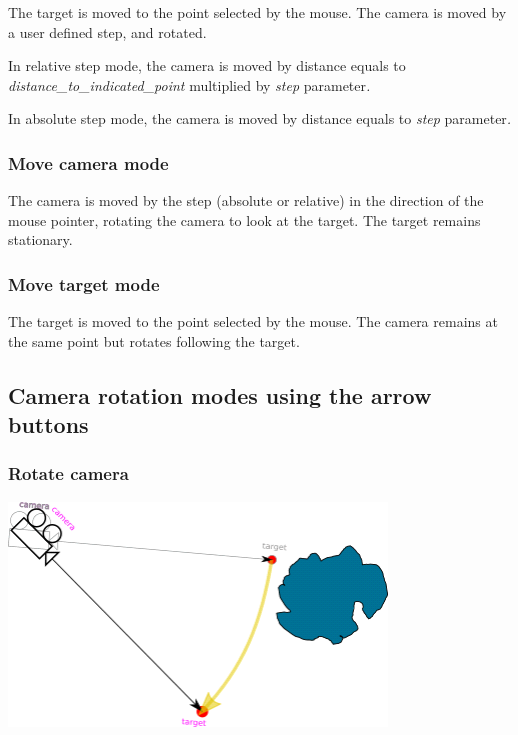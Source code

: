 The target is moved to the point selected by the mouse. The camera is moved by a
user defined step, and rotated.

In relative step mode, the camera is moved by distance equals to
\emph{distance\_to\_indicated\_point} multiplied by \emph{step}
parameter\emph{.}

In absolute step mode, the camera is moved by distance equals to \emph{step}
parameter\emph{.}

\subsubsection{Move camera mode}\label{move-camera-mode-1}

The camera is moved by the step (absolute or relative) in the direction of the
mouse pointer, rotating the camera to look at the target. The target remains
stationary.

\subsubsection{Move target mode}\label{move-target-mode-1}

The target is moved to the point selected by the mouse. The camera remains at
the same point but rotates following the target.

\subsection{Camera rotation modes using the arrow
	buttons}\label{camera-rotation-modes-using-the-arrow-buttons}

\subsubsection{Rotate camera}\label{rotate-camera}

\includegraphics[width=3.95347in,height=2.34861in]{img/manual/media/image14.png}

